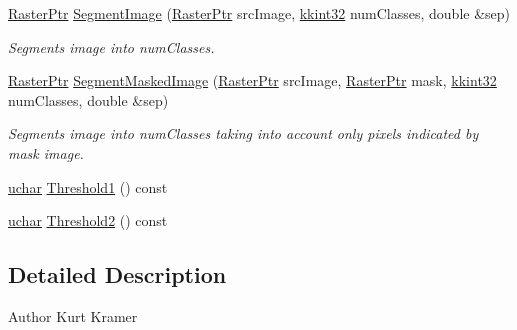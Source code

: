 \begin{DoxyCompactItemize}
\hyperlink{namespace_k_k_b_a80d46bd24db644a022c863bce8ae3633}{Raster\+Ptr} \hyperlink{class_k_k_b_1_1_segmentor_o_t_s_u_af8b22e4627b37f91c5d93ec034891e7b}{Segment\+Image} (\hyperlink{namespace_k_k_b_a80d46bd24db644a022c863bce8ae3633}{Raster\+Ptr} src\+Image, \hyperlink{namespace_k_k_b_a8fa4952cc84fda1de4bec1fbdd8d5b1b}{kkint32} num\+Classes, double \&sep)
\begin{DoxyCompactList}\small\item\em Segments image into \textquotesingle{}num\+Classes\textquotesingle{}. \end{DoxyCompactList}\item 
\hyperlink{namespace_k_k_b_a80d46bd24db644a022c863bce8ae3633}{Raster\+Ptr} \hyperlink{class_k_k_b_1_1_segmentor_o_t_s_u_affd9743f640bfb1bc88f1528bd3e8d28}{Segment\+Masked\+Image} (\hyperlink{namespace_k_k_b_a80d46bd24db644a022c863bce8ae3633}{Raster\+Ptr} src\+Image, \hyperlink{namespace_k_k_b_a80d46bd24db644a022c863bce8ae3633}{Raster\+Ptr} mask, \hyperlink{namespace_k_k_b_a8fa4952cc84fda1de4bec1fbdd8d5b1b}{kkint32} num\+Classes, double \&sep)
\begin{DoxyCompactList}\small\item\em Segments image into \textquotesingle{}num\+Classes\textquotesingle{} taking into account only pixels indicated by \textquotesingle{}mask\textquotesingle{} image. \end{DoxyCompactList}\item 
\hyperlink{namespace_k_k_b_ace9969169bf514f9ee6185186949cdf7}{uchar} \hyperlink{class_k_k_b_1_1_segmentor_o_t_s_u_a84ba37425ca9e067fac8cf698729479b}{Threshold1} () const 
\item 
\hyperlink{namespace_k_k_b_ace9969169bf514f9ee6185186949cdf7}{uchar} \hyperlink{class_k_k_b_1_1_segmentor_o_t_s_u_a15d934ccfc4d73945877160f3c74b08b}{Threshold2} () const 
\end{DoxyCompactItemize}


\subsection{Detailed Description}
\begin{DoxyAuthor}{Author}
Kurt Kramer
\end{DoxyAuthor}


